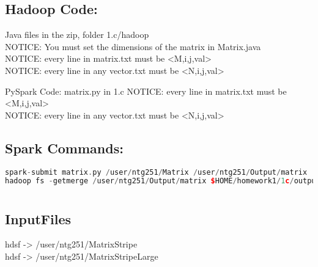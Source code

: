 \subsection*{Hadoop Code:}
Java files in the zip, folder 1.c/hadoop
\\
NOTICE: You must set the dimensions of the matrix in Matrix.java
\\
NOTICE: every line in matrix.txt must be <M,i,j,val>
\\
NOTICE: every line in any vector.txt must be <N,i,j,val>

PySpark Code: matrix.py in 1.c
NOTICE: every line in matrix.txt must be <M,i,j,val>
\\
NOTICE: every line in any vector.txt must be <N,i,j,val>

\subsection*{Spark Commands:}
\begin{lstlisting}[language=c++]
spark-submit matrix.py /user/ntg251/Matrix /user/ntg251/Output/matrix
hadoop fs -getmerge /user/ntg251/Output/matrix $HOME/homework1/1c/output.txt
\end{lstlisting}

\section*{}
\subsection*{InputFiles}
hdsf -> /user/ntg251/MatrixStripe
\\
hdsf -> /user/ntg251/MatrixStripeLarge

